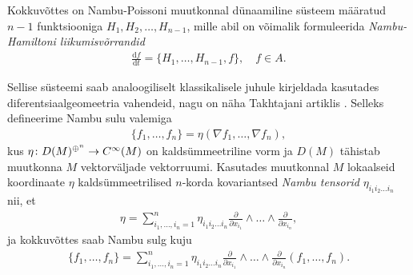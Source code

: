 Kokkuvõttes on Nambu-Poissoni muutkonnal dünaamiline süsteem määratud
$n-1$ funktsiooniga $H_1, H_2, \dots, H_{n-1}$, mille abil on võimalik
formuleerida \emph{Nambu-Hamiltoni liikumisvõrrandid}
\begin{align*}
    \frac{\mathrm{d} f}{\mathrm{d} t} = \{H_1, \dots, H_{n-1}, f\},
    \quad f \in A.
\end{align*}

Sellise süsteemi saab analoogiliselt klassikalisele juhule kirjeldada
kasutades diferentsiaalgeomeetria vahendeid, nagu on näha
Takhtajani artiklis \cite{takhtajan1994}. Selleks defineerime Nambu
sulu valemiga
\begin{align*}
    \{f_1, \dots, f_n\} = \eta\left( \nabla f_1, \dots, \nabla f_n \right),
\end{align*}
kus $\eta \colon D(M)^{\oplus^n} \to C^\infty(M)$ on kaldsümmeetriline vorm ja
$D(M)$ tähistab muutkonna $M$ vektorväljade vektorruumi. Kasutades
muutkonnal $M$ lokaalseid koordinaate $\eta$ kaldsümmeetrilised
$n$-korda kovariantsed \emph{Nambu tensorid} $\eta_{i_1 i_2 \dots i_n}$
nii, et
\begin{align*}
    \eta = \sum_{i_1, \dots, i_n = 1}^{n} \eta_{i_1 i_2 \dots i_n}
        \frac{\partial}{\partial x_{i_1}}
        \wedge \dots \wedge
        \frac{\partial}{\partial x_{i_n}},
\end{align*}
ja kokkuvõttes saab Nambu sulg kuju
\begin{align*}
    \{f_1, \dots, f_n\} =
    \sum_{i_1, \dots, i_n = 1}^{n} \eta_{i_1 i_2 \dots i_n}
        \frac{\partial}{\partial x_{i_1}}
        \wedge \dots \wedge
        \frac{\partial}{\partial x_{i_n}} (f_1, \dots, f_n).
\end{align*}

